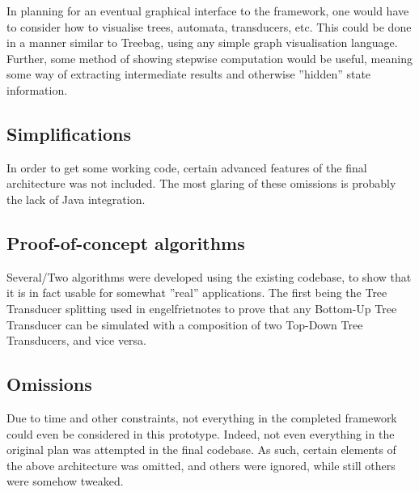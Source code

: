 In planning for an eventual graphical interface to the framework, one would
have to consider how to visualise trees, automata, transducers, etc. This
could be done in a manner similar to Treebag, using any simple graph
visualisation language. Further, some method of showing stepwise
computation would be useful, meaning some way of extracting intermediate
results and otherwise ''hidden'' state information.


\subsection{Simplifications}


In order to get some working code, certain advanced features of the final
architecture was not included. The most glaring of these omissions is
probably the lack of Java integration. %


\subsection{Proof-of-concept algorithms}

Several/Two algorithms were developed using the existing codebase, to show
that it is in fact usable for somewhat ''real'' applications. The first
being the Tree Transducer splitting used in engelfrietnotes to prove that
any Bottom-Up Tree Transducer can be simulated with a composition of two
Top-Down Tree Transducers, and vice versa.


\subsection{Omissions}

Due to time and other constraints, not everything in the completed
framework could even be considered in this prototype. Indeed, not even
everything in the original plan was attempted in the final codebase. As
such, certain elements of the above architecture was omitted, and others
were ignored, while still others were somehow tweaked.
